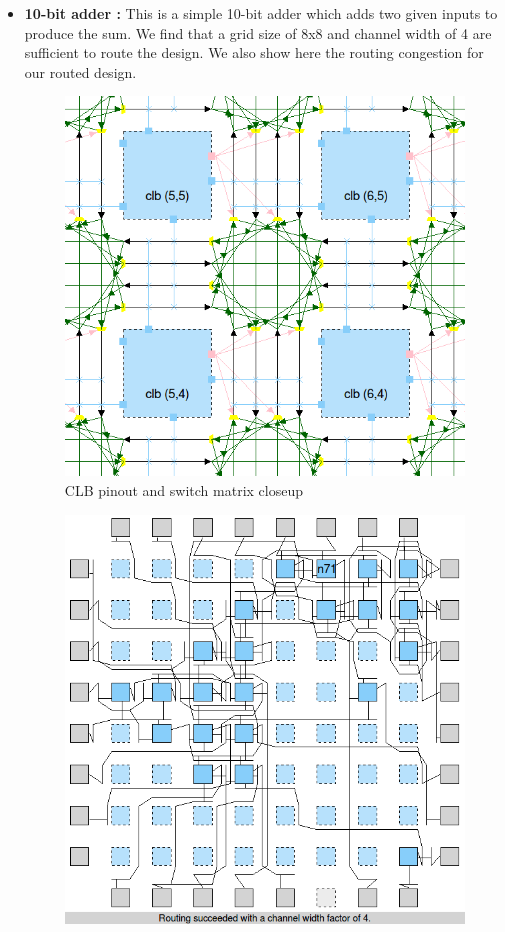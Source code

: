 \begin{itemize}

\item \textbf{10-bit adder :} This is a simple 10-bit adder which adds two given inputs to produce the sum. We find that a grid size of 8x8 and channel width of 4 are sufficient to route the design. We also show here the routing congestion for our routed design.

\begin{figure}[H]
\centering
\includegraphics[scale=0.4]{BTP_work/8x8_closeup.png}
\caption{CLB pinout and switch matrix closeup}
\label{fig:Figure}
\end{figure}
\begin{figure}[H]
\centering
\includegraphics[scale=0.3]{BTP_work/8x8_adder_routing.png}

\end{figure}
\end{itemize}

